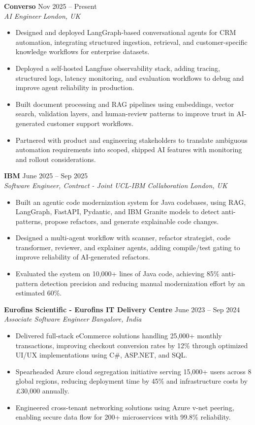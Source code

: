 \documentclass[10pt,letterpaper]{article}
\newcommand{\role}[4]{
  \vspace{2pt}
  {\bfseries\color{ink} #1} \hfill {\small\color{muted} #2}\\
  {\itshape\color{muted} #3} \hfill {\small\itshape\color{muted} #4}
}
\begin{document}
\role{Converso}{Nov 2025 -- Present}{AI Engineer}{London, UK}
\begin{itemize}
  \item Designed and deployed LangGraph-based conversational agents for CRM automation, integrating structured ingestion, retrieval, and customer-specific knowledge workflows for enterprise datasets.
  \item Deployed a self-hosted Langfuse observability stack, adding tracing, structured logs, latency monitoring, and evaluation workflows to debug and improve agent reliability in production.
  \item Built document processing and RAG pipelines using embeddings, vector search, validation layers, and human-review patterns to improve trust in AI-generated customer support workflows.
  \item Partnered with product and engineering stakeholders to translate ambiguous automation requirements into scoped, shipped AI features with monitoring and rollout considerations.
\end{itemize}

\role{IBM}{June 2025 -- Sep 2025}{Software Engineer, Contract - Joint UCL-IBM Collaboration}{London, UK}
\begin{itemize}
  \item Built an agentic code modernization system for Java codebases, using RAG, LangGraph, FastAPI, Pydantic, and IBM Granite models to detect anti-patterns, propose refactors, and generate explainable code changes.
  \item Designed a multi-agent workflow with scanner, refactor strategist, code transformer, reviewer, and explainer agents, adding compile/test gating to improve reliability of AI-generated refactors.
  \item Evaluated the system on 10,000+ lines of Java code, achieving 85\% anti-pattern detection precision and reducing manual modernization effort by an estimated 60\%.
\end{itemize}

\newpage
\role{Eurofins Scientific - Eurofins IT Delivery Centre}{June 2023 -- Sep 2024}{Associate Software Engineer}{Bangalore, India}
\begin{itemize}
  \item Delivered full-stack eCommerce solutions handling 25,000+ monthly transactions, improving checkout conversion rates by 12\% through optimized UI/UX implementations using C\#, ASP.NET, and SQL.
  \item Spearheaded Azure cloud segregation initiative serving 15,000+ users across 8 global regions, reducing deployment time by 45\% and infrastructure costs by \pounds30,000 annually.
  \item Engineered cross-tenant networking solutions using Azure v-net peering, enabling secure data flow for 200+ microservices with 99.8\% reliability.
\end{itemize}
\end{document}
